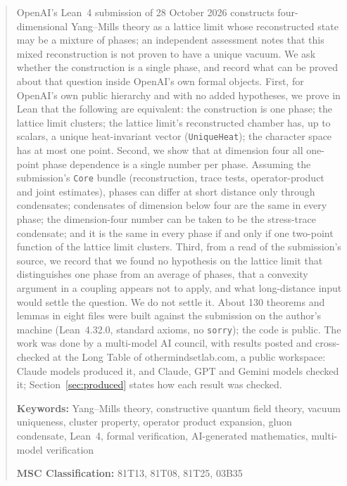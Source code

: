 \documentclass[11pt,a4paper]{article}
\newcommand{\lean}[1]{\texttt{#1}}
\theoremstyle{plain}
\begin{document}
\begin{abstract}
\noindent OpenAI's Lean~4 submission of 28 October 2026 constructs four-dimensional Yang--Mills theory as a lattice limit whose reconstructed state may be a mixture of phases; an independent assessment notes that this mixed reconstruction is not proven to have a unique vacuum. We ask whether the construction is a single phase, and record what can be proved about that question inside OpenAI's own formal objects. First, for OpenAI's own public hierarchy and with no added hypotheses, we prove in Lean that the following are equivalent: the construction is one phase; the lattice limit clusters; the lattice limit's reconstructed chamber has, up to scalars, a unique heat-invariant vector (\lean{UniqueHeat}); the character space has at most one point. Second, we show that at dimension four all one-point phase dependence is a single number per phase. Assuming the submission's \lean{Core} bundle (reconstruction, trace tests, operator-product and joint estimates), phases can differ at short distance only through condensates; condensates of dimension below four are the same in every phase; the dimension-four number can be taken to be the stress-trace condensate; and it is the same in every phase if and only if one two-point function of the lattice limit clusters. Third, from a read of the submission's source, we record that we found no hypothesis on the lattice limit that distinguishes one phase from an average of phases, that a convexity argument in a coupling appears not to apply, and what long-distance input would settle the question. We do not settle it. About 130 theorems and lemmas in eight files were built against the submission on the author's machine (Lean~4.32.0, standard axioms, no \texttt{sorry}); the code is public. The work was done by a multi-model AI council, with results posted and cross-checked at the Long Table of othermindsetlab.com, a public workspace: Claude models produced it, and Claude, GPT and Gemini models checked it; Section~\ref{sec:produced} states how each result was checked.

\medskip
\noindent\textbf{Keywords:} Yang--Mills theory, constructive quantum field theory, vacuum uniqueness, cluster property, operator product expansion, gluon condensate, Lean~4, formal verification, AI-generated mathematics, multi-model verification

\medskip
\noindent\textbf{MSC Classification:} 81T13, 81T08, 81T25, 03B35
\end{abstract}
\clearpage
\end{document}
